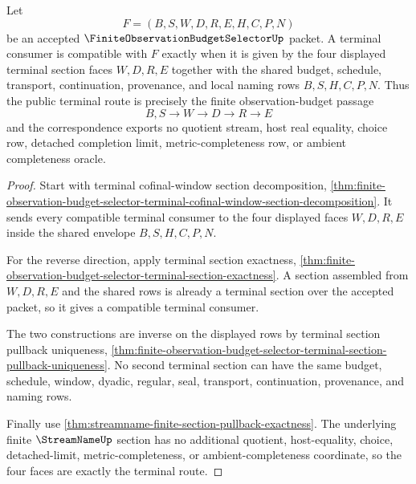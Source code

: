 \begin{theorem}
\label{thm:finite-observation-budget-selector-four-face-terminal-correspondence}
Let
$$
F=(B,S,W,D,R,E,H,C,P,N)
$$
be an accepted $\FiniteObservationBudgetSelectorUp$ packet. A terminal consumer is compatible with $F$ exactly when it is given by the four displayed terminal section faces $W,D,R,E$ together with the shared budget, schedule, transport, continuation, provenance, and local naming rows $B,S,H,C,P,N$. Thus the public terminal route is precisely the finite observation-budget passage
$$
B,S \to W \to D \to R \to E
$$
and the correspondence exports no quotient stream, host real equality, choice row, detached completion limit, metric-completeness row, or ambient completeness oracle.
\end{theorem}
\begin{proof}
Start with terminal cofinal-window section decomposition, \autoref{thm:finite-observation-budget-selector-terminal-cofinal-window-section-decomposition}. It sends every compatible terminal consumer to the four displayed faces $W,D,R,E$ inside the shared envelope $B,S,H,C,P,N$.

For the reverse direction, apply terminal section exactness, \autoref{thm:finite-observation-budget-selector-terminal-section-exactness}. A section assembled from $W,D,R,E$ and the shared rows is already a terminal section over the accepted packet, so it gives a compatible terminal consumer.

The two constructions are inverse on the displayed rows by terminal section pullback uniqueness, \autoref{thm:finite-observation-budget-selector-terminal-section-pullback-uniqueness}. No second terminal section can have the same budget, schedule, window, dyadic, regular, seal, transport, continuation, provenance, and naming rows.

Finally use \autoref{thm:streamname-finite-section-pullback-exactness}. The underlying finite $\StreamNameUp$ section has no additional quotient, host-equality, choice, detached-limit, metric-completeness, or ambient-completeness coordinate, so the four faces are exactly the terminal route.
\end{proof}

